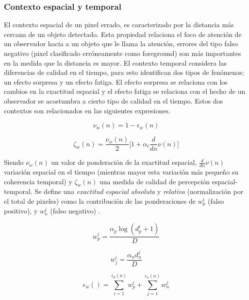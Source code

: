 \subsubsection{Contexto espacial y temporal}
El contexto espacial \cite{cavallaro_objective_2002} de un pixel errado, es caracterizado por la distancia más cercana de un objeto detectado. Esta propiedad relaciona el foco de atención de un observador hacia a un objeto que le llama la atención, errores del tipo falso negativo (pixel clasificado erróneamente como foreground) son más importantes en la medida que la distancia es mayor. El contexto temporal considera las diferencias de calidad en el tiempo, para esto identifican dos tipos de fenómenos; un efecto sorpresa y un efecto fatiga. El efecto sorpresa se relaciona con los cambios en la exactitud espacial y el efecto fatiga se relaciona con el hecho de un observador se acostumbra a cierto tipo de calidad en el tiempo. Estos dos contextos son relacionados en las siguientes expresiones.

\begin{equation}
\nu_w(n) = 1 - \epsilon_w(n)
\end{equation}

\begin{equation}
\zeta_w(n) = \frac{\nu_w(n)}{2} \lbrack 1 + \alpha_t \frac{d}{dn}\nu(n) \rbrack
\end{equation}

Siendo $\nu_w(n)$ un valor de ponderación de la exactitud espacial, $\frac{d}{dn}\nu(n)$ variación espacial en el tiempo (mientras mayor esta variación más pequeño su coherencia temporal) y $\zeta_w(n)$ una medida de calidad de percepción espacial-temporal. Se define una \emph{exactitud espacial absoluta} y \emph{relativa} (normalización por el total de pixeles) como la contribución de las ponderaciones de $w^i_p$ (falso positivo), y $w^j_n$ (falso negativo) . 

\begin{equation}
w^i_p = \frac{\alpha_p \log(d^i_p + 1)}{D}
\end{equation}

\begin{equation}
w^i_j = \frac{\alpha_nd^j_n}{D}
\end{equation}

\begin{equation}
\epsilon_w() = \sum_{i=1}^{\epsilon_p(n)}w^i_p +	 \sum_{j=1}^{\epsilon_n(n)} w^j_n
\end{equation}


